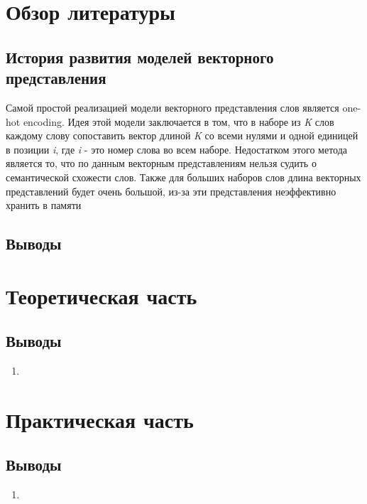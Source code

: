 \documentclass[a4paper,14pt]{article}
\begin{document}
\newpage




\section{Обзор литературы}

\subsection{История развития моделей векторного представления}


Самой простой реализацией модели векторного представления слов является one-hot encoding.
Идея этой модели заключается в том, что в наборе из \textit{K} слов каждому слову сопоставить вектор длиной \textit{K} со всеми нулями и одной единицей в позиции \textit{i}, где \textit{i} - это номер слова во всем наборе.
Недостатком этого метода является то, что по данным векторным представлениям нельзя судить о семантической схожести слов.
Также для больших наборов слов длина векторных представлений будет очень большой, из-за эти представления неэффективно хранить в памяти



\subsection{Выводы}

\newpage

\section{Теоретическая часть}
\subsection{Выводы}
\begin{enumerate}
	\itemsep0em 
	\item 
\end{enumerate}

\newpage
\section{Практическая часть}

\subsection{Выводы}
\begin{enumerate}
	\itemsep0em 
	\item 
\end{enumerate}
\end{document}
